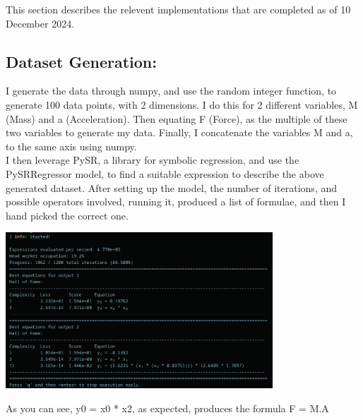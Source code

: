\documentclass{article}
\begin{document}
This section describes the relevent implementations that are completed as of 10 December 2024.\\ 

\subsection{Dataset Generation: }

I generate the data through numpy, and use the random integer function, to generate 100 data points, with 2 dimensions. I do this for 2 different variables, M (Mass) and a (Acceleration). Then equating F (Force), as the multiple of these two variables to generate my data. Finally, I concatenate the variables M and a, to the same axis using numpy. \\ 

I then leverage PySR, a library for symbolic regression, and use the PySRRegressor model, to find a suitable expression to describe the above generated dataset. After setting up the model, the number of iterations, and possible operators involved, running it, produced a list of formulae, and then I hand picked the correct one. \\ 

\begin{center}
\includegraphics[width=10cm]{F_MA}
\end{center}

As you can see, y0 = x0 * x2, as expected, produces the formula F = M.A\\ 




\end{document}
